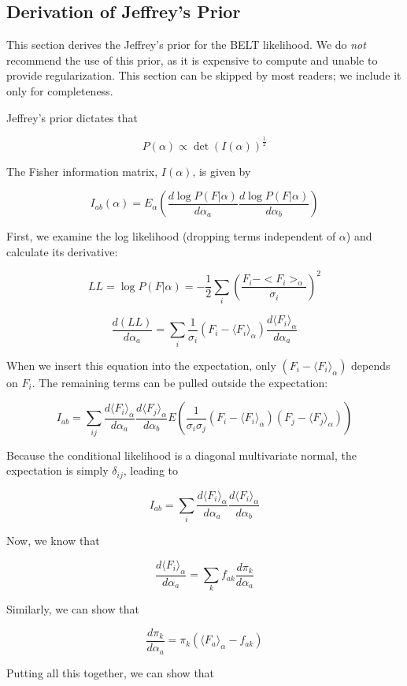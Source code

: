 \documentclass[journal=jacsat,manuscript=article]{achemso}
\begin{document}
\subsection{Derivation of Jeffrey's Prior}

This section derives the Jeffrey's prior for the BELT likelihood.  We do \emph{not} recommend the use of this prior, as it is expensive to compute and unable to provide regularization.  This section can be skipped by most readers; we include it only for completeness.

Jeffrey's prior dictates that 

$$P(\alpha) \propto \det(I(\alpha))^\frac{1}{2}$$

The Fisher information matrix, $I(\alpha)$, is given by

$$I_{ab}(\alpha) = E_\alpha(\frac{d\log P(F|\alpha)}{d\alpha_{a}}\frac{d\log P(F|\alpha)}{d\alpha_{b}})$$

First, we examine the log likelihood (dropping terms independent of $\alpha$) and calculate its derivative:

$$LL = \log P(F|\alpha) = - \frac{1}{2}\sum_i (\frac{F_i - <F_i>_\alpha}{\sigma_i})^2$$

$$\frac{d(LL)}{d\alpha_a} = \sum_i \frac{1}{\sigma_i}(F_i - \langle F_i \rangle_\alpha) \frac{d\langle F_i \rangle_\alpha}{d\alpha_a}$$

When we insert this equation into the expectation, only $(F_i - \langle F_i \rangle_\alpha)$ depends on $F_i$.  The remaining terms can be pulled outside the expectation:

$$I_{ab} = \sum_{ij} \frac{d\langle F_i \rangle_\alpha}{d\alpha_a} \frac{d\langle F_j \rangle_\alpha}{d\alpha_b} E(\frac{1}{\sigma_i \sigma_j}(F_i - \langle F_i \rangle_\alpha)(F_j - \langle F_j \rangle_\alpha))$$

Because the conditional likelihood is a diagonal multivariate normal, the expectation is simply $\delta_{ij}$, leading to 

$$I_{ab} = \sum_{i} \frac{d\langle F_i \rangle_\alpha}{d\alpha_a} \frac{d\langle F_i \rangle_\alpha}{d\alpha_b} $$

Now, we know that 

$$\frac{d\langle F_i \rangle_\alpha}{d\alpha_a} = \sum_k f_{ak} \frac{d\pi_k}{d\alpha_a}$$

Similarly, we can show that

$$\frac{d\pi_k}{d\alpha_a} = \pi_k (\langle F_a \rangle_{\alpha} - f_{ak})$$


Putting all this together, we can show that
\end{document}
